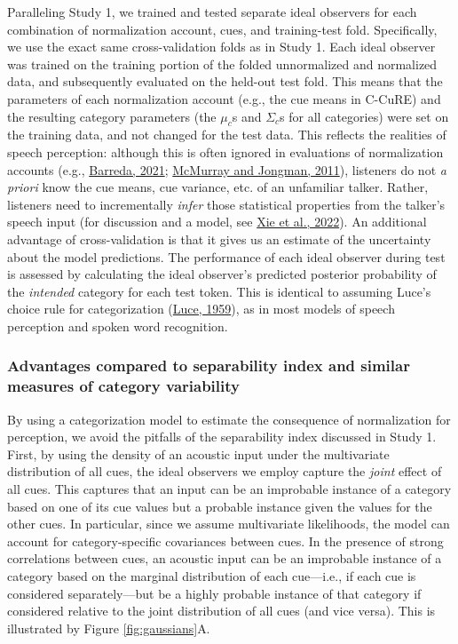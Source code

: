 \documentclass[utf8]{frontiersSCNS}
\begin{document}
Paralleling Study 1, we trained and tested separate ideal observers for each combination of normalization account, cues, and training-test fold. Specifically, we use the exact same cross-validation folds as in Study 1. Each ideal observer was trained on the training portion of the folded unnormalized and normalized data, and subsequently evaluated on the held-out test fold. This means that the parameters of each normalization account (e.g., the cue means in C-CuRE) and the resulting category parameters (the \(\mu_c\)s and \(\Sigma_c\)s for all categories) were set on the training data, and not changed for the test data. This reflects the realities of speech perception: although this is often ignored in evaluations of normalization accounts (e.g., \protect\hyperlink{ref-barreda2021}{Barreda, 2021}; \protect\hyperlink{ref-mcmurray-jongman2011}{McMurray and Jongman, 2011}), listeners do not \emph{a priori} know the cue means, cue variance, etc. of an unfamiliar talker. Rather, listeners need to incrementally \emph{infer} those statistical properties from the talker's speech input (for discussion and a model, see \protect\hyperlink{ref-xie2022}{Xie et al., 2022}). An additional advantage of cross-validation is that it gives us an estimate of the uncertainty about the model predictions. The performance of each ideal observer during test is assessed by calculating the ideal observer's predicted posterior probability of the \emph{intended} category for each test token. This is identical to assuming Luce's choice rule for categorization (\protect\hyperlink{ref-luce1959book}{Luce, 1959}), as in most models of speech perception and spoken word recognition.

\hypertarget{sec:IO-advantages}{%
\subsubsection*{Advantages compared to separability index and similar measures of category variability}\label{sec:IO-advantages}}

By using a categorization model to estimate the consequence of normalization for perception, we avoid the pitfalls of the separability index discussed in Study 1. First, by using the density of an acoustic input under the multivariate distribution of all cues, the ideal observers we employ capture the \emph{joint} effect of all cues. This captures that an input can be an improbable instance of a category based on one of its cue values but a probable instance given the values for the other cues. In particular, since we assume multivariate likelihoods, the model can account for category-specific covariances between cues. In the presence of strong correlations between cues, an acoustic input can be an improbable instance of a category based on the marginal distribution of each cue---i.e., if each cue is considered separately---but be a highly probable instance of that category if considered relative to the joint distribution of all cues (and vice versa). This is illustrated by Figure \ref{fig:gaussians}A.
\end{document}
